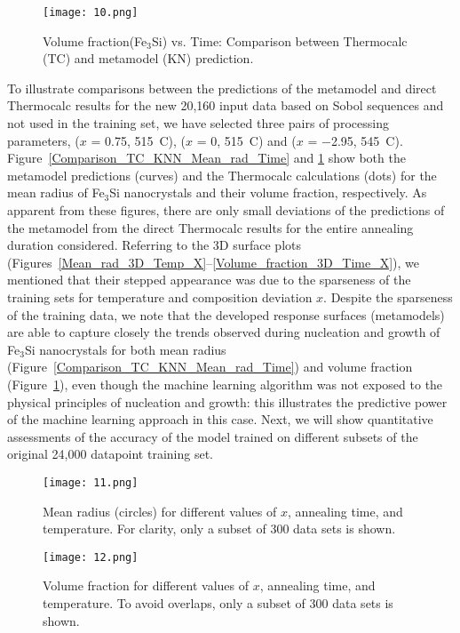 \begin{figure}[ht]
\centering
\texttt{[image: 10.png]}
\caption{Volume fraction(Fe$_3$Si) vs. Time: Comparison between Thermocalc (TC) and metamodel (KN) prediction.\cite{CITRINE}}
\label{Comparison_TC_KNN_Volume_fraction_Time}
\end{figure}
To illustrate comparisons between the predictions of the metamodel and direct Thermocalc results for the
new 20,160 input data based on Sobol sequences and not used in the training set, we have selected three pairs of processing
parameters, ($x$ = 0.75, 515~\degree C), ($x$ = 0, 515~\degree C) and ($x$ = $-$2.95, 545~\degree C). Figure~\ref{Comparison_TC_KNN_Mean_rad_Time} and \ref{Comparison_TC_KNN_Volume_fraction_Time} show both the metamodel predictions (curves) and the Thermocalc calculations (dots) for
the mean radius of Fe$_3$Si nanocrystals and their volume fraction, respectively.
As apparent from these figures, there are only small
deviations of the predictions of the metamodel from the direct Thermocalc results for the entire annealing duration considered.
Referring to the 3D surface plots (Figures~\ref{Mean_rad_3D_Temp_X}--\ref{Volume_fraction_3D_Time_X}), we mentioned that their stepped appearance was due to the
sparseness of the training sets for temperature and composition deviation $x$. Despite the sparseness of the training data,
we note that the developed response surfaces (metamodels) are able to capture closely the trends observed during nucleation and growth of Fe$_3$Si nanocrystals for both  mean radius (Figure~\ref{Comparison_TC_KNN_Mean_rad_Time})  and volume fraction (Figure~\ref{Comparison_TC_KNN_Volume_fraction_Time}), even though the machine learning algorithm was not exposed to the physical principles of nucleation and growth: this illustrates the predictive power of the machine learning approach in this case.
Next, we will show quantitative assessments of the accuracy of the model trained on different subsets of the original 24,000 datapoint training set.

\begin{figure}[ht]
\centering
\texttt{[image: 11.png]}
\caption{Mean radius (circles) for different values of $x$, annealing time, and temperature. For clarity, only
a subset of 300 data sets is shown.\cite{CITRINE}}
\label{Bub_Meanrad}
\end{figure}

\begin{figure}[ht]
\centering
\texttt{[image: 12.png]}
\caption{Volume fraction for different values of $x$, annealing time, and temperature. To avoid overlaps, only
a subset of 300 data sets is shown.\cite{CITRINE}}
\label{Bub_Volfr}
\end{figure}


